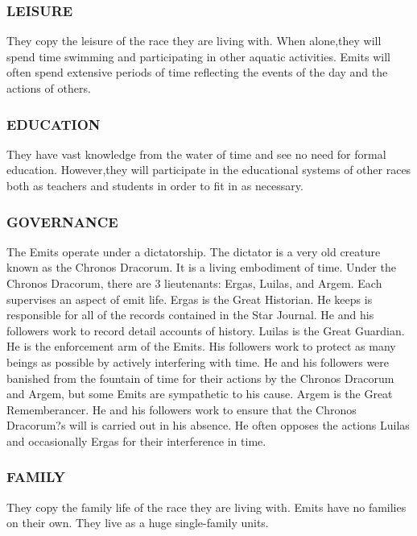 \subsubsection{LEISURE}
They copy the leisure of the race they are living with.  When alone,they will
spend time swimming and participating in other aquatic activities.  Emits will
often spend extensive periods of time reflecting the events of the day and the
actions of others.
\subsubsection{EDUCATION}
They have vast knowledge from the water of time and see no need for formal
education.  However,they will participate in the educational systems of other
races both as teachers and students in order to fit in as necessary.
\subsubsection{GOVERNANCE}
The Emits operate under a dictatorship.  The dictator is a very old creature
known as the Chronos Dracorum.  It is a living embodiment of time.  Under the
Chronos Dracorum, there are 3 lieutenants: Ergas, Luilas, and Argem.  Each
supervises an aspect of emit life.  Ergas is the Great Historian.  He keeps is
responsible for all of the records contained in the Star Journal.  He and his
followers work to record detail accounts of history.  Luilas is the Great
Guardian.  He is the enforcement arm of the Emits.  His followers work to
protect as many beings as possible by actively interfering with time.  He and
his followers were banished from the fountain of time for their actions by the
Chronos Dracorum and Argem, but some Emits are sympathetic to his cause.  Argem
is the Great Rememberancer.  He and his followers work to ensure that the
Chronos Dracorum?s will is carried out in his absence.  He often opposes the
actions Luilas and occasionally Ergas for their interference in time.
\subsubsection{FAMILY}
They copy the family life of the race they are living with.  Emits have no
families on their own.  They live as a huge single-family units.
